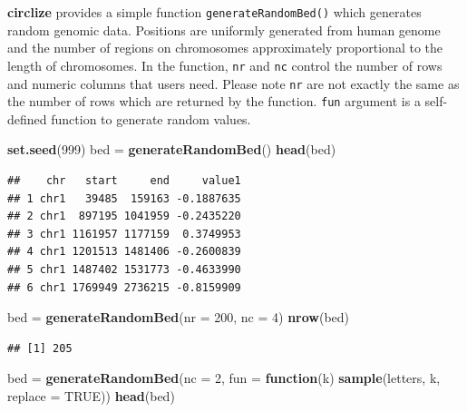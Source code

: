 \documentclass[]{book}
\newenvironment{Shaded}{\begin{snugshade}}{\end{snugshade}}
\newcommand{\KeywordTok}[1]{\textcolor[rgb]{0.13,0.29,0.53}{\textbf{#1}}}
\newcommand{\DataTypeTok}[1]{\textcolor[rgb]{0.13,0.29,0.53}{#1}}
\newcommand{\DecValTok}[1]{\textcolor[rgb]{0.00,0.00,0.81}{#1}}
\newcommand{\StringTok}[1]{\textcolor[rgb]{0.31,0.60,0.02}{#1}}
\newcommand{\OtherTok}[1]{\textcolor[rgb]{0.56,0.35,0.01}{#1}}
\newcommand{\ControlFlowTok}[1]{\textcolor[rgb]{0.13,0.29,0.53}{\textbf{#1}}}
\newcommand{\NormalTok}[1]{#1}
\theoremstyle{definition}
\theoremstyle{definition}
\theoremstyle{remark}
\begin{document}
\textbf{circlize} provides a simple function
\texttt{generateRandomBed()} which generates random genomic data.
Positions are uniformly generated from human genome and the number of
regions on chromosomes approximately proportional to the length of
chromosomes. In the function, \texttt{nr} and \texttt{nc} control the
number of rows and numeric columns that users need. Please note
\texttt{nr} are not exactly the same as the number of rows which are
returned by the function. \texttt{fun} argument is a self-defined
function to generate random values.

\begin{Shaded}
\begin{Highlighting}[]
\KeywordTok{set.seed}\NormalTok{(}\DecValTok{999}\NormalTok{)}
\NormalTok{bed =}\StringTok{ }\KeywordTok{generateRandomBed}\NormalTok{()}
\KeywordTok{head}\NormalTok{(bed)}
\end{Highlighting}
\end{Shaded}

\begin{verbatim}
##    chr   start     end     value1
## 1 chr1   39485  159163 -0.1887635
## 2 chr1  897195 1041959 -0.2435220
## 3 chr1 1161957 1177159  0.3749953
## 4 chr1 1201513 1481406 -0.2600839
## 5 chr1 1487402 1531773 -0.4633990
## 6 chr1 1769949 2736215 -0.8159909
\end{verbatim}

\begin{Shaded}
\begin{Highlighting}[]
\NormalTok{bed =}\StringTok{ }\KeywordTok{generateRandomBed}\NormalTok{(}\DataTypeTok{nr =} \DecValTok{200}\NormalTok{, }\DataTypeTok{nc =} \DecValTok{4}\NormalTok{)}
\KeywordTok{nrow}\NormalTok{(bed)}
\end{Highlighting}
\end{Shaded}

\begin{verbatim}
## [1] 205
\end{verbatim}

\begin{Shaded}
\begin{Highlighting}[]
\NormalTok{bed =}\StringTok{ }\KeywordTok{generateRandomBed}\NormalTok{(}\DataTypeTok{nc =} \DecValTok{2}\NormalTok{, }\DataTypeTok{fun =} \ControlFlowTok{function}\NormalTok{(k) }\KeywordTok{sample}\NormalTok{(letters, k, }\DataTypeTok{replace =} \OtherTok{TRUE}\NormalTok{))}
\KeywordTok{head}\NormalTok{(bed)}
\end{Highlighting}
\end{Shaded}
\end{document}
